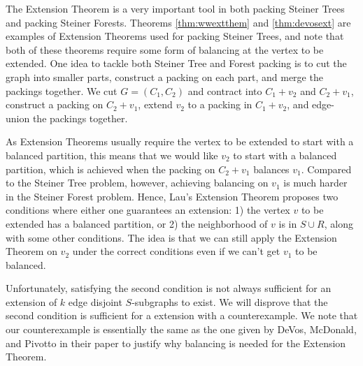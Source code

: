 \documentclass{article}
\begin{document}
The Extension Theorem is a very important tool in both packing Steiner Trees and packing Steiner Forests. Theorems \ref{thm:wwextthem} and \ref{thm:devosext} are examples of Extension Theorems used for packing Steiner Trees, and note that both of these theorems require some form of balancing at the vertex to be extended. One idea to tackle both Steiner Tree and Forest packing is to cut the graph into smaller parts, construct a packing on each part, and merge the packings together. We cut $G=(C_1,C_2)$ and contract into $C_1+v_2$ and $C_2+v_1$, construct a packing on $C_2+v_1$, extend $v_2$ to a packing in $C_1+v_2$, and edge-union the packings together.

As Extension Theorems usually require the vertex to be extended to start with a balanced partition, this means that we would like $v_2$ to start with a balanced partition, which is achieved when the packing on $C_2+v_1$ balances $v_1$. Compared to the Steiner Tree problem, however, achieving balancing on $v_1$ is much harder in the Steiner Forest problem. Hence, Lau's Extension Theorem proposes two conditions where either one guarantees an extension: 1) the vertex $v$ to be extended has a balanced partition, or 2) the neighborhood of $v$ is in $S \cup R$, along with some other conditions. The idea is that we can still apply the Extension Theorem on $v_2$ under the correct conditions even if we can't get $v_1$ to be balanced. 


Unfortunately, satisfying the second condition is not always sufficient for an extension of $k$ edge disjoint $S$-subgraphs to exist. We will disprove that the second condition is sufficient for a extension with a counterexample. We note that our counterexample is essentially the same as the one given by DeVos, McDonald, and Pivotto \cite{devos2016packing} in their paper to justify why balancing is needed for the Extension Theorem.
\end{document}
